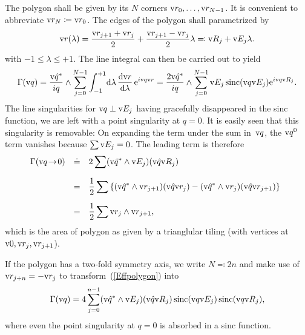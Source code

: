 The polygon shall be given by its $N$ corners $\text{v}{r}_0,\ldots,\text{v}{r}_{N-1}$.
It is convenient to abbreviate $\text{v}{r}_N\coloneqq\text{v}{r}_0$.
The edges of the polygon shall parametrized by
\begin{equation}
  \text{v}{r}(\lambda) = \frac{\text{v}{r}_{j+1}+\text{v}{r}_j}{2} + \frac{\text{v}{r}_{j+1}-\text{v}{r}_j}{2} \lambda
  \eqqcolon \text{v}{R}_j + \text{v}{E}_j\lambda.
\end{equation}
with $-1\le\lambda\le+1$.
The line integral can then be carried out to yield
\begin{equation}\label{Effpolygon}
    \Gamma(\text{v}{q}) = \displaystyle \frac{\text{v}{\hat q^*}}{iq}\wedge \sum_{j=0}^{N-1}
              \int_{-1}^{+1}\!\text{d}\lambda\, \frac{\text{d}\text{v}{r}}{\text{d}\lambda}\,\text{e}^{i\text{v}{q}\text{v}{r}}
          = \displaystyle \frac{2\text{v}{\hat q^*}}{iq}\wedge \sum_{j=0}^{N-1}
              \text{v}{E}_j \operatorname{sinc}(\text{v}{q}\text{v}{E}_j) \text{e}^{i\text{v}{q}\text{v}{R}_j}.
\end{equation}
The line singularities for $\text{v}{q}\perp\text{v}{E}_j$ having gracefully disappeared in the
sinc function,
we are left with a point singularity at $q=0$.
It is easily seen that this singularity is removable:
On expanding the term under the sum in~$\text{v}{q}$,
the $\text{v}{q}^0$ term vanishes because $\sum\text{v}{E}_j=0$.
The leading term is therefore
\begin{equation}
  \begin{array}{@{}lcl}
  \Gamma(\q\!\to\!0) &\doteq& \displaystyle 2\sum (\v{\hat q^*}\wedge\E_j) (\v{\hat q}\R_j)\\[3ex]
    &=&\displaystyle \frac{1}{2}\sum \left\{
        (\v{\hat q^*}\wedge\r_{j+1})(\v{\hat q}\r_j) -
        (\v{\hat q^*}\wedge\r_j)(\v{\hat q}\r_{j+1})
      \right\}\\[3ex]
    &=&\displaystyle \frac{1}{2}\sum \r_j\wedge\r_{j+1},
  \end{array}
\end{equation}
which is the area of polygon
as given by a trianglular tiling (with vertices at $\text{v}{0},\text{v}{r}_j,\text{v}{r}_{j+1}$).

If the polygon has a two-fold symmetry axis, we write $N\eqqcolon2n$
and make use of $\text{v}{r}_{j+n}=-\text{v}{r}_j$ to transform~(\ref{Effpolygon}) into
\begin{equation}\label{Eff2ngon}
    \Gamma(\text{v}{q}) = \displaystyle 4 \sum_{j=0}^{n-1}
              (\text{v}{\hat q^*}\wedge\text{v}{E}_j) (\text{v}{\hat q}\text{v}{R}_j) \operatorname{sinc}(\text{v}{q}\text{v}{E}_j) \operatorname{sinc}(\text{v}{q}\text{v}{R}_j),
\end{equation}
where even the point singularity at $q=0$ is absorbed in a sinc function.
%
%

